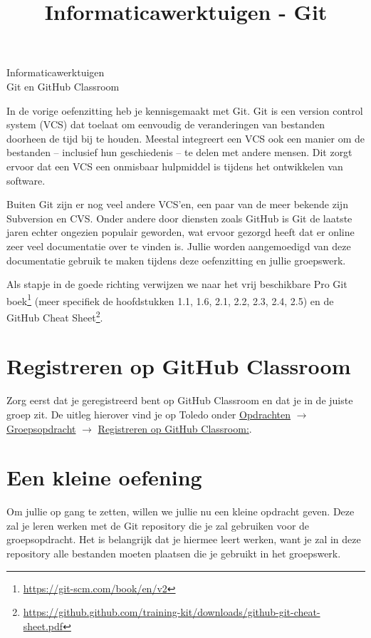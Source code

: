 \documentclass[a4paper]{article}
\title{Informaticawerktuigen - Git}
\begin{document}
\begin{center}
  \huge Informaticawerktuigen \\
  \Huge Git en GitHub Classroom \\
\end{center}
\vspace{1em}

In de vorige oefenzitting heb je kennisgemaakt met Git.
Git is een version control system (VCS) dat toelaat om eenvoudig de veranderingen van bestanden doorheen de tijd bij te houden.
Meestal integreert een VCS ook een manier om de bestanden – inclusief hun geschiedenis – te delen met andere mensen.
Dit zorgt ervoor dat een VCS een onmisbaar hulpmiddel is tijdens het ontwikkelen van software.

Buiten Git zijn er nog veel andere VCS’en, een paar van de meer bekende zijn Subversion en CVS.
Onder andere door diensten zoals GitHub is Git de laatste jaren echter ongezien populair geworden, wat ervoor gezorgd heeft dat er online zeer veel documentatie over te vinden is.
Jullie worden aangemoedigd van deze documentatie gebruik te maken tijdens deze oefenzitting en jullie groepswerk.

Als stapje in de goede richting verwijzen we naar het vrij beschikbare Pro Git boek\footnote{\url{https://git-scm.com/book/en/v2}} (meer specifiek de hoofdstukken 1.1, 1.6, 2.1, 2.2, 2.3, 2.4, 2.5) en de GitHub Cheat Sheet\footnote{\url{https://github.github.com/training-kit/downloads/github-git-cheat-sheet.pdf}}.

\section{Registreren op GitHub Classroom}

Zorg eerst dat je geregistreerd bent op GitHub Classroom en dat je in de juiste groep zit.
De uitleg hierover vind je op Toledo onder \underline{Opdrachten} $\rightarrow$ \underline{Groepsopdracht} $\rightarrow$ \underline{Registreren op GitHub Classroom:}.


\section{Een kleine oefening}
Om jullie op gang te zetten, willen we jullie nu een kleine opdracht geven.
Deze zal je leren werken met de Git repository die je zal gebruiken voor de groepsopdracht.
Het is belangrijk dat je hiermee leert werken, want je zal in deze repository alle bestanden moeten plaatsen die je gebruikt in het groepswerk.
\end{document}
